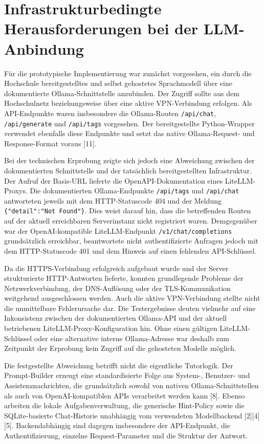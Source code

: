 \section{Infrastrukturbedingte Herausforderungen bei der LLM-Anbindung}

Für die prototypische Implementierung war zunächst vorgesehen, ein durch die Hochschule bereitgestelltes und selbst gehostetes Sprachmodell über eine dokumentierte Ollama-Schnittstelle anzubinden. Der Zugriff sollte aus dem Hochschulnetz beziehungsweise über eine aktive VPN-Verbindung erfolgen. Als API-Endpunkte waren insbesondere die Ollama-Routen \texttt{/api/chat}, \texttt{/api/generate} und \texttt{/api/tags} vorgesehen. Der bereitgestellte Python-Wrapper verwendet ebenfalls diese Endpunkte und setzt das native Ollama-Request- und Response-Format voraus [11].

Bei der technischen Erprobung zeigte sich jedoch eine Abweichung zwischen der dokumentierten Schnittstelle und der tatsächlich bereitgestellten Infrastruktur. Der Aufruf der Basis-URL lieferte die OpenAPI-Dokumentation eines LiteLLM-Proxys. Die dokumentierten Ollama-Endpunkte \texttt{/api/tags} und \texttt{/api/chat} antworteten jeweils mit dem HTTP-Statuscode 404 und der Meldung \texttt{\{"detail":"Not Found"\}}. Dies weist darauf hin, dass die betreffenden Routen auf der aktuell erreichbaren Serverinstanz nicht registriert waren. Demgegenüber war der OpenAI-kompatible LiteLLM-Endpunkt \texttt{/v1/chat/completions} grundsätzlich erreichbar, beantwortete nicht authentifizierte Anfragen jedoch mit dem HTTP-Statuscode 401 und dem Hinweis auf einen fehlenden API-Schlüssel.

Da die HTTPS-Verbindung erfolgreich aufgebaut wurde und der Server strukturierte HTTP-Antworten lieferte, konnten grundlegende Probleme der Netzwerkverbindung, der DNS-Auflösung oder der TLS-Kommunikation weitgehend ausgeschlossen werden. Auch die aktive VPN-Verbindung stellte nicht die unmittelbare Fehlerursache dar. Die Testergebnisse deuten vielmehr auf eine Inkonsistenz zwischen der dokumentierten Ollama-API und der aktuell betriebenen LiteLLM-Proxy-Konfiguration hin. Ohne einen gültigen LiteLLM-Schlüssel oder eine alternative interne Ollama-Adresse war deshalb zum Zeitpunkt der Erprobung kein Zugriff auf die gehosteten Modelle möglich.

Die festgestellte Abweichung betrifft nicht die eigentliche Tutorlogik. Der Prompt-Builder erzeugt eine standardisierte Folge aus System-, Benutzer- und Assistenznachrichten, die grundsätzlich sowohl von nativen Ollama-Schnittstellen als auch von OpenAI-kompatiblen APIs verarbeitet werden kann [8]. Ebenso arbeiten die lokale Aufgabenverwaltung, die generische Hint-Policy sowie die SQLite-basierte Chat-Historie unabhängig vom verwendeten Modellbackend [2][4][5]. Backendabhängig sind dagegen insbesondere der API-Endpunkt, die Authentifizierung, einzelne Request-Parameter und die Struktur der Antwort.

